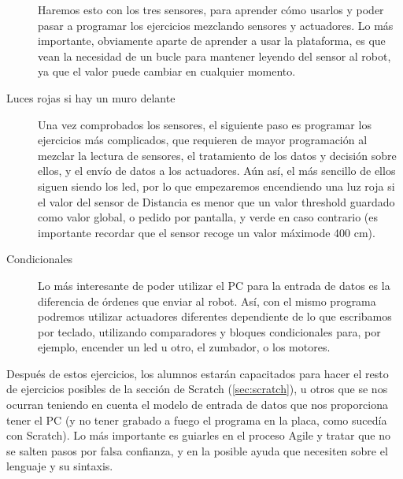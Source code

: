 \begin{description}
	Haremos esto con los tres sensores, para aprender cómo usarlos y poder pasar a programar los ejercicios mezclando sensores y actuadores. Lo más importante, obviamente aparte de aprender a usar la plataforma, es que vean la necesidad de un bucle para mantener leyendo del sensor al robot, ya que el valor puede cambiar en cualquier momento.
	\item [Luces rojas si hay un muro delante] Una vez comprobados los sensores, el siguiente paso es programar los ejercicios más complicados, que requieren de mayor programación al mezclar la lectura de sensores, el tratamiento de los datos y decisión sobre ellos, y el envío de datos a los actuadores. Aún así, el más sencillo de ellos siguen siendo los led, por lo que empezaremos encendiendo una luz roja si el valor del sensor de Distancia es menor que un valor threshold guardado como valor global, o pedido por pantalla, y verde en caso contrario (es importante recordar que el sensor recoge un valor máximode 400 cm).
	\item [Condicionales] Lo más interesante de poder utilizar el PC para la entrada de datos es la diferencia de órdenes que enviar al robot. Así, con el mismo programa podremos utilizar actuadores diferentes dependiente de lo que escribamos por teclado, utilizando comparadores y bloques condicionales para, por ejemplo, encender un led u otro, el zumbador, o los motores. 
	
\end{description}

Después de estos ejercicios, los alumnos estarán capacitados para hacer el resto de ejercicios posibles de la sección de Scratch (\ref{sec:scratch}), u otros que se nos ocurran teniendo en cuenta el modelo de entrada de datos que nos proporciona tener el PC (y no tener grabado a fuego el programa en la placa, como sucedía con Scratch). Lo más importante es guiarles en el proceso Agile y tratar que no se salten pasos por falsa confianza, y en la posible ayuda que necesiten sobre el lenguaje y su sintaxis. 